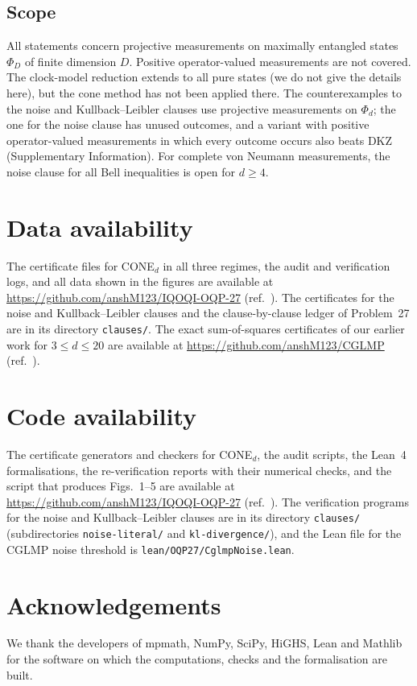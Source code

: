 \documentclass[11pt]{article}
\begin{document}
\subsection*{Scope}
All statements concern projective measurements on maximally entangled states $\Phi_D$ of finite dimension $D$. Positive
operator-valued measurements are not covered. The clock-model reduction extends to all pure states (we do not give
the details here), but the cone method has not been applied there. The counterexamples to the noise and
Kullback--Leibler clauses use projective measurements on $\Phi_d$; the one for the noise clause has unused outcomes, and
a variant with positive operator-valued measurements in which every outcome occurs also beats DKZ (Supplementary
Information). For complete von Neumann measurements, the noise clause for all Bell inequalities is open for $d\ge4$.

\section*{Data availability}
The certificate files for CONE$_d$ in all three regimes, the audit and verification logs, and all data shown in the
figures are available at \url{https://github.com/anshM123/IQOQI-OQP-27} (ref.~).
The certificates for the noise and Kullback--Leibler clauses and the clause-by-clause ledger of Problem~27 are in its
directory \texttt{clauses/}.
The exact sum-of-squares certificates of our earlier work for $3\le d\le20$ are available at
\url{https://github.com/anshM123/CGLMP} (ref.~).

\section*{Code availability}
The certificate generators and checkers for CONE$_d$, the audit scripts, the Lean~4 formalisations, the
re-verification reports with their numerical checks, and the script that produces Figs.~1--5 are available at
\url{https://github.com/anshM123/IQOQI-OQP-27} (ref.~). The verification
programs for the noise and Kullback--Leibler clauses are in its directory \texttt{clauses/} (subdirectories
\texttt{noise-literal/} and \texttt{kl-divergence/}), and the Lean file for the CGLMP noise threshold is
\texttt{lean/OQP27/CglmpNoise.lean}.


{\small\singlespacing

}

\section*{Acknowledgements}
We thank the developers of mpmath, NumPy, SciPy, HiGHS, Lean and Mathlib for the software on which the computations,
checks and the formalisation are built.
\end{document}
